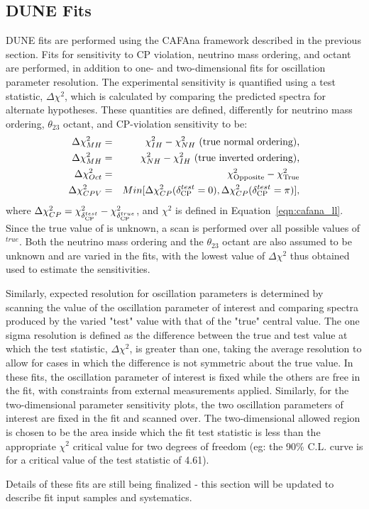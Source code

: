 \subsection{DUNE Fits}
\label{sect:methods-dunefits}
DUNE fits are performed using the CAFAna framework described in the previous section. Fits for sensitivity to CP violation, neutrino mass ordering, and octant are performed, in addition to one- and two-dimensional fits for oscillation parameter resolution.
The experimental sensitivity is quantified using a test statistic, $\Delta\chi^2$, which is calculated by comparing the predicted spectra for alternate hypotheses. These quantities are defined, differently for neutrino mass ordering, $\theta_{23}$ octant, and CP-violation sensitivity to be:
\begin{eqnarray}
\Delta\chi^2_{MH} & = & \chi^2_{IH} - \chi^2_{NH}\textrm{ (true normal ordering),}\label{eq:dx2_MH}\\
\Delta\chi^2_{MH} & = & \chi^2_{NH} - \chi^2_{IH}\textrm{ (true inverted ordering),}\\
\Delta\chi^2_{Oct} & = & \chi^2_{\textrm{Opposite}} - \chi^2_{\textrm{True}} \\
\Delta\chi^2_{CPV} & = & Min[\Delta\chi^2_{CP}(\delta_{\rm CP}^{test}=0),\Delta\chi^2_{CP}(\delta_{\rm CP}^{test}=\pi)],
\end{eqnarray}
where $\Delta\chi^2_{CP} = \chi^{2}_{\delta_{\rm CP}^{test}} - \chi^2_{\delta_{\rm CP}^{true}}$, and $\chi^2$ is defined in Equation~\ref{eqn:cafana_ll}. Since the true value of \deltacp is unknown, a scan is performed over all possible values of \deltacp$^{true}$. Both the neutrino mass ordering and the $\theta_{23}$ octant are also assumed to be unknown and are varied in the fits, with the lowest value of $\Delta\chi^2$ thus obtained used to estimate the sensitivities. 

Similarly, expected resolution for oscillation parameters is determined by scanning the value of the oscillation parameter of interest and comparing spectra produced by the varied "test" value with that of the "true" central value. The one sigma resolution is defined as the difference between the true and test value at which the test statistic, $\Delta\chi^2$, is greater than one, taking the average resolution to allow for cases in which the difference is not symmetric about the true value. In these fits, the oscillation parameter of interest is fixed while the others are free in the fit, with constraints from external measurements applied. Similarly, for the two-dimensional parameter sensitivity plots, the two oscillation parameters of interest are fixed in the fit and scanned over. The two-dimensional allowed region is chosen to be the area inside which the fit test statistic is less than the appropriate $\chi^2$ critical value for two degrees of freedom (eg: the 90\% C.L. curve is for a critical value of the test statistic of 4.61).

Details of these fits are still being finalized - this section will be updated to describe fit input samples and systematics.

